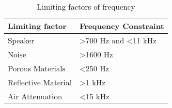 
\begin{table}[H]
\captionsetup{singlelinecheck = false, format= hang, justification=raggedright, font=footnotesize, labelsep=space}
\caption{Limiting factors of frequency}
\begin{adjustbox}{max width=\textwidth}
\begin{tabular}{p{7.95cm}p{7.95cm}}
\hline
\multicolumn{1}{|p{7.95cm}}{Limiting factor } & 
\multicolumn{1}{|p{7.95cm}|}{Frequency Constraint} \\ 
\hline
\multicolumn{1}{|p{7.95cm}}{Speaker} & 
\multicolumn{1}{|p{7.95cm}|}{>700 Hz and <11 kHz} \\ 
\hline
\multicolumn{1}{|p{7.95cm}}{Noise } & 
\multicolumn{1}{|p{7.95cm}|}{>1600 Hz} \\ 
\hline
\multicolumn{1}{|p{7.95cm}}{Porous Materials} & 
\multicolumn{1}{|p{7.95cm}|}{<250 Hz} \\ 
\hline
\multicolumn{1}{|p{7.95cm}}{Reflective Material} & 
\multicolumn{1}{|p{7.95cm}|}{>1 kHz} \\ 
\hline
\multicolumn{1}{|p{7.95cm}}{Air Attenuation } & 
\multicolumn{1}{|p{7.95cm}|}{<15 kHz} \\ 
\hline
\end{tabular}
\end{adjustbox}
\label{tab:limiting_factors_frequency}
\end{table}